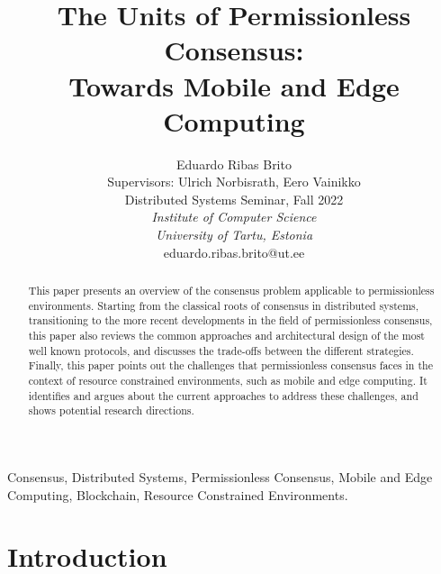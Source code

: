 \documentclass[journal]{IEEEtran}
\begin{document}
\title{The Units of Permissionless Consensus: \\ Towards Mobile and Edge Computing}

\author{Eduardo Ribas Brito 
\\Supervisors: Ulrich Norbisrath, Eero Vainikko
\\Distributed Systems Seminar, Fall 2022
\\\emph{Institute of Computer Science}
\\\emph{University of Tartu, Estonia}
\\ eduardo.ribas.brito@ut.ee}

\maketitle

\begin{abstract}

This paper presents an overview of the consensus problem
applicable to permissionless environments. Starting from 
the classical roots of consensus in distributed systems,
transitioning to the more recent developments in the
field of permissionless consensus, this paper also reviews
the common approaches and architectural design of the most well known protocols, 
and discusses the trade-offs between the different strategies.
Finally, this paper points out the challenges that
permissionless consensus faces in the context of resource
constrained environments, such as mobile and edge computing.
It identifies and argues about the current approaches to address these challenges,
and shows potential research directions.

\end{abstract}

\begin{IEEEkeywords}
Consensus, Distributed Systems, Permissionless Consensus, Mobile and Edge Computing, Blockchain, Resource Constrained Environments.
\end{IEEEkeywords}

\section{Introduction}
\end{document}

